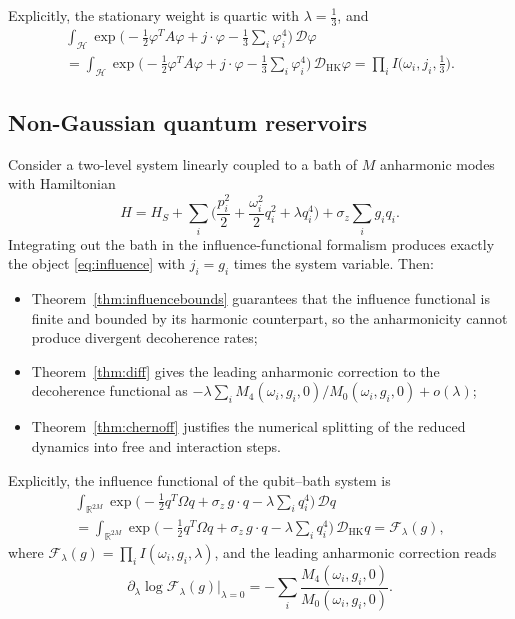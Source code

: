 \documentclass[11pt,a4paper]{article}
\theoremstyle{plain}
\theoremstyle{definition}
\theoremstyle{remark}
\newcommand{\dphi}{\mathcal{D}\varphi}
\newcommand{\dhk}{\mathcal{D}_{\mathrm{HK}}\varphi}
\newcommand{\R}{\mathbb{R}}
\begin{document}
Explicitly, the stationary weight is quartic with $\lambda=\tfrac13$, and
\begin{multline*}
\int_{\mathcal{H}}\exp\!\Big(-\frac12\varphi^{T}A\varphi+j\cdot\varphi
  -\frac13\sum_{i}\varphi_i^{4}\Big)\,\dphi\\
=\int_{\mathcal{H}}\exp\!\Big(-\frac12\varphi^{T}A\varphi+j\cdot\varphi
  -\frac13\sum_{i}\varphi_i^{4}\Big)\,\dhk
=\prod_{i} I\big(\omega_i,j_i,\tfrac13\big).
\end{multline*}

\subsection{Non-Gaussian quantum reservoirs}

Consider a two-level system linearly coupled to a bath of $M$ anharmonic modes with
Hamiltonian
\[
H=H_S+\sum_i\Big(\frac{p_i^{2}}{2}+\frac{\omega_i^{2}}{2}q_i^{2}+\lambda q_i^{4}\Big)
+\sigma_z\sum_i g_i q_i .
\]
Integrating out the bath in the influence-functional formalism produces exactly the
object \eqref{eq:influence} with $j_i=g_i$ times the system variable. Then:
\begin{itemize}
\item Theorem~\ref{thm:influencebounds} guarantees that the influence functional is
finite and bounded by its harmonic counterpart, so the anharmonicity cannot produce
divergent decoherence rates;
\item Theorem~\ref{thm:diff} gives the leading anharmonic correction to the decoherence
functional as $-\lambda\sum_i M_4(\omega_i,g_i,0)/M_0(\omega_i,g_i,0)+o(\lambda)$;
\item Theorem~\ref{thm:chernoff} justifies the numerical splitting of the reduced
dynamics into free and interaction steps.
\end{itemize}

Explicitly, the influence functional of the qubit--bath system is
\begin{multline*}
\int_{\R^{2M}}\exp\!\Big(-\frac12 q^{T}\Omega q+\sigma_z\,g\cdot q
  -\lambda\sum_{i}q_i^{4}\Big)\,\mathcal{D}q\\
=\int_{\R^{2M}}\exp\!\Big(-\frac12 q^{T}\Omega q+\sigma_z\,g\cdot q
  -\lambda\sum_{i}q_i^{4}\Big)\,\mathcal{D}_{\mathrm{HK}}q
=\mathcal{F}_\lambda(g),
\end{multline*}
where $\mathcal{F}_\lambda(g)=\prod_i I(\omega_i,g_i,\lambda)$, and the leading
anharmonic correction reads
\[
\partial_\lambda \log\mathcal{F}_\lambda(g)\big|_{\lambda=0}
=-\sum_i \frac{M_4(\omega_i,g_i,0)}{M_0(\omega_i,g_i,0)}.
\]
\end{document}
